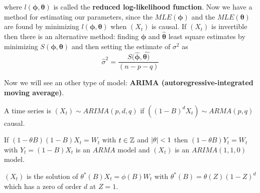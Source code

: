 where $l(\boldsymbol{\phi},\boldsymbol{\theta})$ is called the \textbf{reduced log-likelihood function}. Now we have a method for estimating our parameters, since the $MLE(\boldsymbol{\phi})$ and the $MLE(\boldsymbol{\theta})$ are found by minimizing $l(\boldsymbol{\phi},\boldsymbol{\theta})$ when $(X_t)$ is causal. If $(X_t)$ is invertible then there is an alternative method: finding $\hat{\boldsymbol{\phi}}$ and $\hat{\boldsymbol{\theta}}$ least square estimates by minimizing $S(\boldsymbol{\phi},\boldsymbol{\theta})$ and then setting the estimate of $\sigma^2$ as
\[
    \hat{\sigma}^2=\frac{S(\hat{\boldsymbol{\phi}},\hat{\boldsymbol{\theta})}}{(n-p-q)}  
\]

Now we will see an other type of model: \textbf{ARIMA (autoregressive-integrated moving average)}.
\begin{definition}
    A time series is $(X_t)\sim ARIMA(p,d,q)$ if $\left((1-B)^dX_t\right)\sim ARMA(p,q)$ causal.
\end{definition}

\begin{example}
    If $(1-\theta B)(1-B)X_t=W_t$ with $t\in\mathbb{Z}$ and $\left|\theta\right|<1$ then $(1-\theta B)Y_t=W_t$ with $Y_t=(1-B)X_t$ is an $ARMA$ model and $(X_t)$ is an $ARIMA(1,1,0)$ model.
\end{example}

\begin{remark}
    $(X_t)$ is the solution of $\theta^*(B)X_t=\phi(B)W_t$ with $\theta^*(B)=\theta(Z)(1-Z)^d$ which has a zero of order $d$ at $Z=1$.
\end{remark}